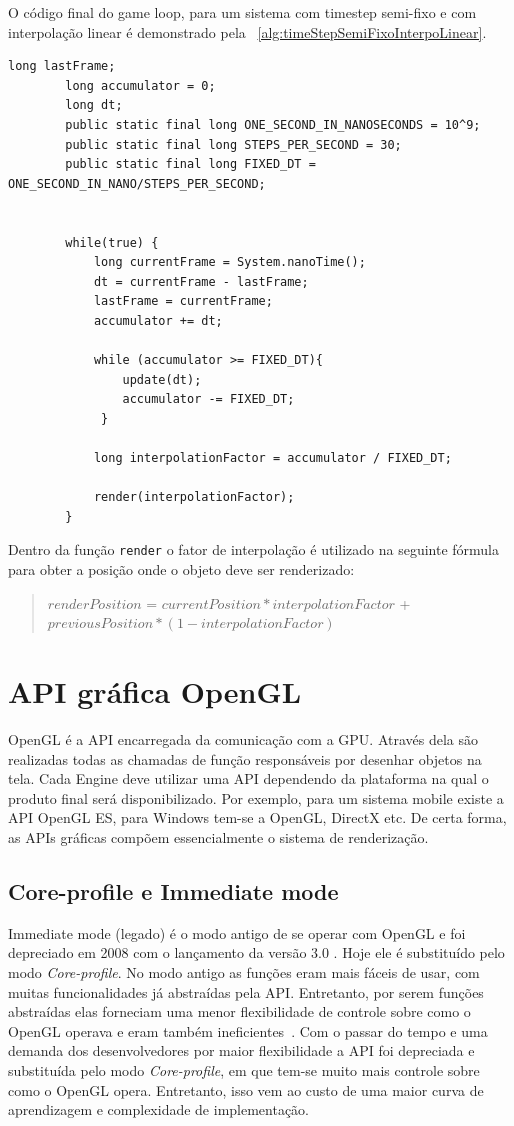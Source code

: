 \documentclass[12pt, 
openright, 
oneside, 
a4paper,    
brazil]{facom-ufu-abntex2}
\begin{document}
\noindent
O código final do game loop, para um sistema com timestep semi-fixo e com interpolação linear é demonstrado pela \lstlistingname~\ref{alg:timeStepSemiFixoInterpoLinear}.
\begin{lstlisting}[caption=Game Loop com timestep semi-fixo e interpolação linear, label={alg:timeStepSemiFixoInterpoLinear}
]
		long lastFrame;
		long accumulator = 0;
		long dt;
		public static final long ONE_SECOND_IN_NANOSECONDS = 10^9;
		public static final long STEPS_PER_SECOND = 30;
		public static final long FIXED_DT = ONE_SECOND_IN_NANO/STEPS_PER_SECOND;
		
		
		while(true) {
			long currentFrame = System.nanoTime(); 
			dt = currentFrame - lastFrame;
			lastFrame = currentFrame;
			accumulator += dt;
	
			while (accumulator >= FIXED_DT){
    			update(dt);
    			accumulator -= FIXED_DT;
 			 }
 			 
			long interpolationFactor = accumulator / FIXED_DT; 			 
 			 
			render(interpolationFactor);
		}
\end{lstlisting}
Dentro da função \texttt{render} o fator de interpolação é utilizado na seguinte fórmula para obter a posição onde o objeto deve ser renderizado:

\begin{quote}
$renderPosition$ = $currentPosition * interpolationFactor$ + $previousPosition * (1 - interpolationFactor)$
\end{quote}

\section{API gráfica OpenGL}
OpenGL é a API encarregada da comunicação com a GPU. Através dela são realizadas todas as chamadas de função responsáveis por desenhar objetos na tela. Cada Engine deve utilizar uma API dependendo da plataforma na qual o produto final será disponibilizado. Por exemplo, para um sistema mobile existe a API OpenGL ES, para Windows tem-se a OpenGL, DirectX etc. De certa forma, as APIs gráficas compõem essencialmente o sistema de renderização.  

\subsection{Core-profile e Immediate mode}
Immediate mode (legado) é o modo antigo de se operar com OpenGL e foi depreciado em 2008 com o lançamento da versão 3.0 \cite{OpenGLHistory}. Hoje ele é substituído pelo modo \textit{Core-profile}. No modo antigo as funções eram mais fáceis de usar, com muitas funcionalidades já abstraídas pela API. Entretanto, por serem funções abstraídas elas forneciam uma menor flexibilidade de controle sobre como o OpenGL  operava e eram também ineficientes~\cite{LearnOpenGL}. Com o passar do tempo e uma demanda dos desenvolvedores por maior flexibilidade a API foi depreciada e substituída pelo modo \textit{Core-profile}, em que tem-se muito mais controle sobre como o OpenGL opera. Entretanto, isso vem ao custo de uma maior curva de aprendizagem e complexidade de implementação.
\end{document}
